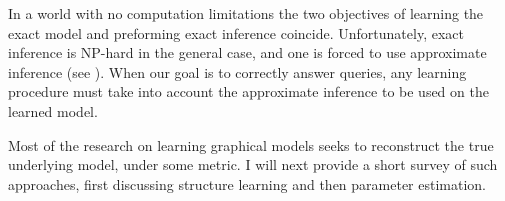 In a world with no computation limitations the two objectives of learning the exact model and preforming exact inference coincide. Unfortunately, exact inference is NP-hard in the general case, and one is forced to use approximate inference (see ).
When our goal is to correctly answer queries, any learning procedure must take into account the approximate inference to be used on the learned model.

Most of the research on learning graphical models seeks to reconstruct the true underlying model, under some metric. I will next provide a short survey of such approaches, first discussing structure learning and then parameter estimation.



